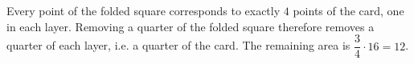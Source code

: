 Every point of the folded square corresponds to exactly $4$ points of the card, one in each layer. Removing a quarter of the folded square therefore removes a quarter of each layer, i.e. a quarter of the card. The remaining area is $\dfrac34\cdot16=\boxed{12}$.
